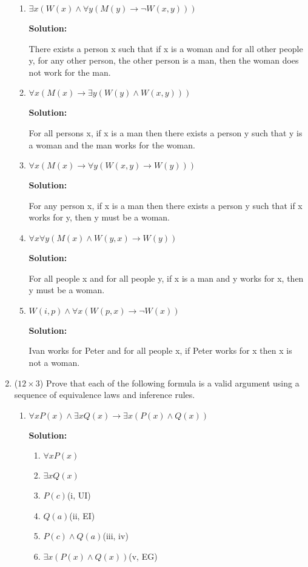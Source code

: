 \documentclass[12pt]{article}
\begin{document}
\begin{enumerate}
\begin{enumerate}
\item
$\exists x(W(x) \land \forall y (M(y) \to \lnot W(x,y)))$

{\bf Solution:}

There exists a person x such that if x is a woman and for all other people y, for any other person, the other person is a man, then the woman does not work for the man.

\item
$\forall x (M(x)\to \exists y (W(y) \land W(x,y)))$

{\bf Solution:}

For all persons x, if x is a man then there exists a person y such that y is a woman and the man works for the woman.

\item
$\forall x (M(x) \to \forall y (W(x,y) \to W(y)) )$

{\bf Solution:}

For any person x, if x is a man then there exists a person y such that if x works for y, then y must be a woman.

\item
$\forall x \forall y (M(x) \land W(y,x) \to W(y))$

{\bf Solution:}

For all people x and for all people y, if x is a man and y works for x, then y must be a woman.

\item
$W(i,p) \land \forall x (W(p,x) \to \lnot W(x))$

{\bf Solution:}

Ivan works for Peter and for all people x, if Peter works for x then x is not a woman.

\end{enumerate}



\newpage

\item ($12 \times 3$)
Prove that each of the following formula is a valid argument using a sequence of equivalence laws and inference rules.
\begin{enumerate}

\item
$\forall x P(x) \land \exists x Q(x) \to \exists x(P(x) \land Q(x))$

{\bf Solution:}

\begin{enumerate}
	\item $\forall xP(x)$
	\item $\exists xQ(x)$
	\item $P(c)$\hfill(i, UI)
	\item $Q(a)$\hfill(ii, EI)
	\item $P(c) \land Q(a)$\hfill(iii, iv)
	\item $\exists x(P(x) \land Q(x))$\hfill(v, EG)
\end{enumerate}


\end{enumerate}
\end{enumerate}
\end{document}
